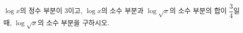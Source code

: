 $\log x$의 정수 부분이 $3$이고, $\log x$의 소수 부분과 $\log\sqrt{x}$의 소수 부분의 합이 $\dfrac{3}{4}$일 때, $\log\sqrt{x}$의 소수 부분을 구하시오.
